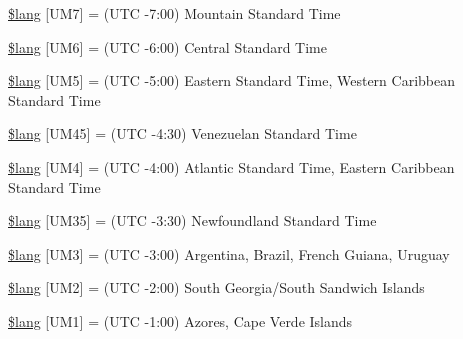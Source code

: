 \begin{DoxyCompactItemize}
\item 
\hyperlink{system_2language_2english_2date__lang_8php_aa642f12cf461f915682b17c0c30b2475}{\$lang} \mbox{[}\textquotesingle{}U\+M7\textquotesingle{}\mbox{]} = \textquotesingle{}(U\+T\+C -\/7\+:00) Mountain Standard Time\textquotesingle{}
\item 
\hyperlink{system_2language_2english_2date__lang_8php_a30f39dd7748d488f4a0140751336d257}{\$lang} \mbox{[}\textquotesingle{}U\+M6\textquotesingle{}\mbox{]} = \textquotesingle{}(U\+T\+C -\/6\+:00) Central Standard Time\textquotesingle{}
\item 
\hyperlink{system_2language_2english_2date__lang_8php_a557150a51633e11dc49e3bfd2e1c091e}{\$lang} \mbox{[}\textquotesingle{}U\+M5\textquotesingle{}\mbox{]} = \textquotesingle{}(U\+T\+C -\/5\+:00) Eastern Standard Time, Western Caribbean Standard Time\textquotesingle{}
\item 
\hyperlink{system_2language_2english_2date__lang_8php_aac9f8a1e0da4b3cee00a19fe9ac642d0}{\$lang} \mbox{[}\textquotesingle{}U\+M45\textquotesingle{}\mbox{]} = \textquotesingle{}(U\+T\+C -\/4\+:30) Venezuelan Standard Time\textquotesingle{}
\item 
\hyperlink{system_2language_2english_2date__lang_8php_a42f66872f4a082bcb2ee004bd2716828}{\$lang} \mbox{[}\textquotesingle{}U\+M4\textquotesingle{}\mbox{]} = \textquotesingle{}(U\+T\+C -\/4\+:00) Atlantic Standard Time, Eastern Caribbean Standard Time\textquotesingle{}
\item 
\hyperlink{system_2language_2english_2date__lang_8php_a389c4a60af83efd29503f60033f3071d}{\$lang} \mbox{[}\textquotesingle{}U\+M35\textquotesingle{}\mbox{]} = \textquotesingle{}(U\+T\+C -\/3\+:30) Newfoundland Standard Time\textquotesingle{}
\item 
\hyperlink{system_2language_2english_2date__lang_8php_abd67512895187d494bbfb18f8d8fee43}{\$lang} \mbox{[}\textquotesingle{}U\+M3\textquotesingle{}\mbox{]} = \textquotesingle{}(U\+T\+C -\/3\+:00) Argentina, Brazil, French Guiana, Uruguay\textquotesingle{}
\item 
\hyperlink{system_2language_2english_2date__lang_8php_a8ee2f132b462bb709fc3402a592ff573}{\$lang} \mbox{[}\textquotesingle{}U\+M2\textquotesingle{}\mbox{]} = \textquotesingle{}(U\+T\+C -\/2\+:00) South Georgia/South Sandwich Islands\textquotesingle{}
\item 
\hyperlink{system_2language_2english_2date__lang_8php_a036e0074236b996b33231b051eda2973}{\$lang} \mbox{[}\textquotesingle{}U\+M1\textquotesingle{}\mbox{]} = \textquotesingle{}(U\+T\+C -\/1\+:00) Azores, Cape Verde Islands\textquotesingle{}

\end{DoxyCompactItemize}
